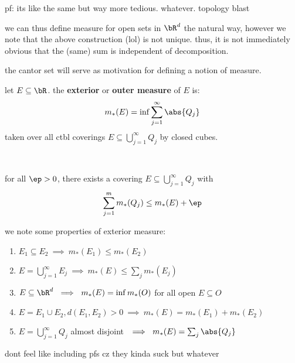 pf: its like the same but way more tedious. whatever. topology blast

we can thus define measure for open sets in $\bR^{d}$ the natural way, however
we note that the above construction (lol) is not unique.
thus, it is not immediately obvious that the (same) sum is independent of
decomposition.

the cantor set will serve as motivation for defining a notion of measure.
\begin{defn}
    let $E\subseteq\bR$. the \textbf{exterior} or \textbf{outer measure} of $E$
    is:
    \begin{equation*}
        m_{*}(E) = \inf\sum_{j=1}^{\infty}\abs{Q_{j}}
    \end{equation*}
    taken over all ctbl coverings $E\subseteq\bigcup_{j=1}^{\infty}Q_{j}$ by
    closed cubes.
\end{defn} \

\begin{crll}
    for all $\ep>0$, there exists a covering $E\subseteq\bigcup_{j=1}^{\infty}
    Q_{j}$ with
    \begin{equation*}
        \sum_{j=1}^{m}m_{*}(Q_{j})\leq m_{*}(E)+\ep
    \end{equation*}
\end{crll}

we note some properties of exterior measure:
\begin{enumerate}
    \item $E_{1}\subseteq E_{2}\ \implies \ m_{*}(E_{1})\leq m_{*}(E_{2})$
    \item $E=\bigcup_{j=1}^{\infty}E_{j}\ \implies \
        m_{*}(E)\leq\sum_{j}m_{*}(E_{j})$
    \item $E\subseteq\bR^{d}\ \implies \ m_{*}(E)=\inf m_{*}(O)$ for all open
        $E\subseteq O$
    \item $E=E_{1}\cup E_{2},d(E_{1},E_{2})>0\ \implies \
        m_{*}(E)=m_{*}(E_{1})+m_{*}(E_{2})$
    \item $E=\bigcup_{j=1}^{\infty}Q_{j}$ almost disjoint $\ \implies \
        m_{*}(E)=\sum_{j}\abs{Q_{j}}$
\end{enumerate}
dont feel like including pfs cz they kinda suck but whatever

